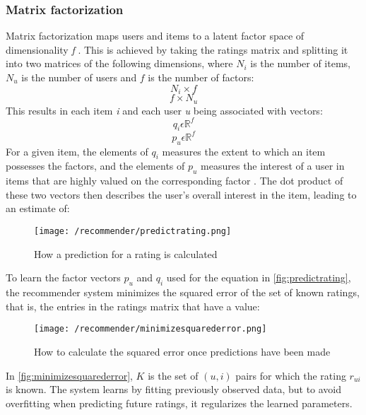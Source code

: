 \subsubsection{Matrix factorization}
Matrix factorization maps users and items to a latent factor space of dimensionality \textit{f} \cite{MatrixFactorization}. 
This is achieved by taking the ratings matrix and splitting it into two matrices of the following dimensions, where $N_{i}$ is the number of items, $N_{u}$ is the number of users and $f$ is the number of factors:
\begin{equation}
    N_{i} \times f
\end{equation} 
\begin{equation}
    f \times N_{u}
\end{equation}
This results in each item \textit{i} and each user \textit{u} being associated with vectors: 
\begin{equation}
    q_{i} \epsilon \mathbb{R}^f
\end{equation}
\begin{equation}
    p_{u} \epsilon \mathbb{R}^f
\end{equation}
For a given item, the elements of $q_{i}$ measures the extent to which an item possesses the factors, and the elements of $p_{u}$ measures the interest of a user in items that are highly valued on the corresponding factor \cite{MatrixFactorization}.
The dot product of these two vectors then describes the user's overall interest in the item, leading to an estimate of:
\begin{figure}[H]
    \centering
    \texttt{[image: /recommender/predictrating.png]}
     \caption{How a prediction for a rating is calculated}
     \label{fig:predictrating}
 \end{figure}
 \noindent
To learn the factor vectors $p_{u}$ and $q_{i}$ used for the equation in \autoref{fig:predictrating}, the recommender system minimizes the squared error of the set of known ratings, that is, the entries in the ratings matrix that have a value:
 \begin{figure}[H]
    \centering
    \texttt{[image: /recommender/minimizesquarederror.png]}
     \caption{How to calculate the squared error once predictions have been made}
     \label{fig:minimizesquarederror}
 \end{figure}
 \noindent
 In \autoref{fig:minimizesquarederror}, $K$ is the set of $(u, i)$ pairs for which the rating $r_{ui}$ is known.
 The system learns by fitting previously observed data, but to avoid overfitting when predicting future ratings, it regularizes the learned parameters.
